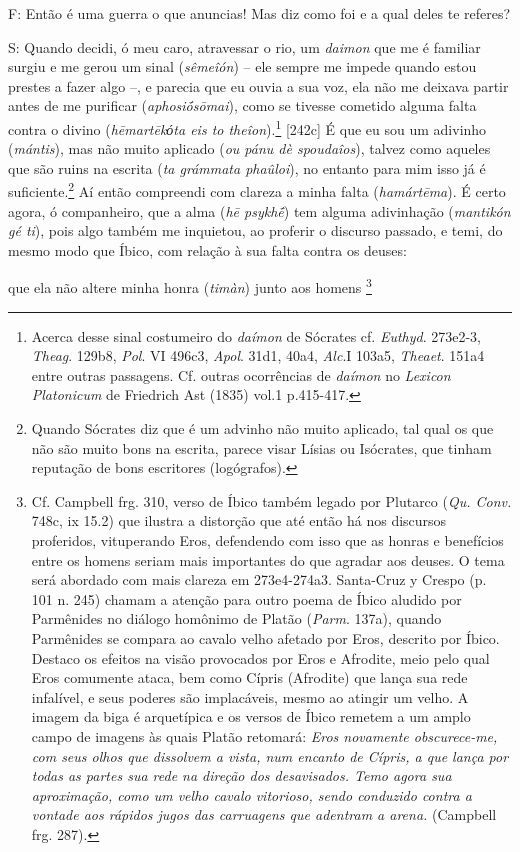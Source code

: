 F: Então é uma guerra o que anuncias! Mas diz como foi e a qual deles te
referes?

S: Quando decidi, ó meu caro, atravessar o rio, um \emph{daimon} que me
é familiar surgiu e me gerou um sinal (\emph{sêmeîón}) -- ele sempre me
impede quando estou prestes a fazer algo --, e parecia que eu ouvia a
sua voz, ela não me deixava partir antes de me purificar
(\emph{aphosiṓsōmai}), como se tivesse cometido alguma falta contra o
divino (\emph{hēmartēkόta eis to theîon}).\footnote{Acerca desse sinal
  costumeiro do \emph{daímon} de Sócrates cf. \emph{Euthyd}. 273e2-3,
  \emph{Theag}. 129b8, \emph{Pol}. VI 496c3, \emph{Apol}. 31d1, 40a4,
  \emph{Alc}.I 103a5, \emph{Theaet}. 151a4 entre outras passagens. Cf.
  outras ocorrências de \emph{daímon} no \emph{Lexicon Platonicum} de
  Friedrich Ast (1835) vol.1 p.415-417.} {[}242c{]} É que eu sou um
adivinho (\emph{mántis}), mas não muito aplicado (\emph{ou pánu dè
spoudaîos}), talvez como aqueles que são ruins na escrita (\emph{ta
grámmata phaûloi}), no entanto para mim isso já é suficiente.\footnote{Quando
  Sócrates diz que é um advinho não muito aplicado, tal qual os que não
  são muito bons na escrita, parece visar Lísias ou Isócrates, que
  tinham reputação de bons escritores (logógrafos).} Aí então compreendi
com clareza a minha falta (\emph{hamártēma}). É certo agora, ó
companheiro, que a alma (\emph{hē psykhḗ}) tem alguma adivinhação
(\emph{mantikón gé ti}), pois algo também me inquietou, ao proferir o
discurso passado, e temi, do mesmo modo que Íbico, com relação à sua
falta contra os deuses:

que ela não altere minha honra (\emph{timàn}) junto aos homens
\footnote{Cf. Campbell frg. 310, verso de Íbico também legado por
  Plutarco (\emph{Qu. Conv.} 748c, ix 15.2) que ilustra a distorção que
  até então há nos discursos proferidos, vituperando Eros, defendendo
  com isso que as honras e benefícios entre os homens seriam mais
  importantes do que agradar aos deuses. O tema será abordado com mais
  clareza em 273e4-274a3. Santa-Cruz y Crespo (p. 101 n. 245) chamam a
  atenção para outro poema de Íbico aludido por Parmênides no diálogo
  homônimo de Platão (\emph{Parm}. 137a), quando Parmênides se compara
  ao cavalo velho afetado por Eros, descrito por Íbico. Destaco os
  efeitos na visão provocados por Eros e Afrodite, meio pelo qual Eros
  comumente ataca, bem como Cípris (Afrodite) que lança sua rede
  infalível, e seus poderes são implacáveis, mesmo ao atingir um velho.
  A imagem da biga é arquetípica e os versos de Íbico remetem a um amplo
  campo de imagens às quais Platão retomará: \emph{Eros novamente
  obscurece-me, com seus olhos que dissolvem a vista, num encanto de
  Cípris, a que lança por todas as partes sua rede na direção dos
  desavisados. Temo agora sua aproximação, como um velho cavalo
  vitorioso, sendo conduzido contra a vontade aos rápidos jugos das
  carruagens que adentram a arena.} (Campbell frg. 287).}

